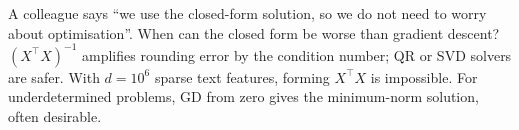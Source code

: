 \begin{qa}{\deep A colleague says ``we use the closed-form solution, so we do not need to worry about optimisation''. When can
the closed form be worse than gradient descent?}
\why $(X^\top X)^{-1}$ amplifies rounding error by the condition number; QR or SVD solvers are safer. With $d = 10^6$ sparse text
features, forming $X^\top X$ is impossible. For underdetermined problems, GD from zero gives the minimum-norm solution, often
desirable.
\end{qa}
